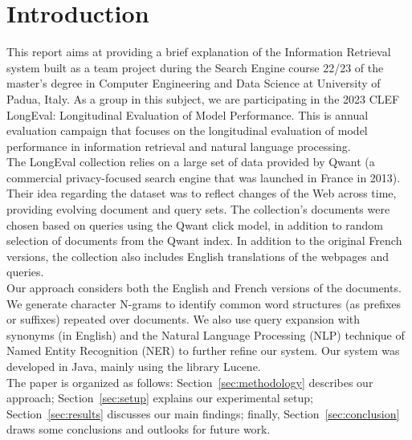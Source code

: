 \section{Introduction}\label{sec:introduction}
This report aims at providing a brief explanation of the Information Retrieval system built
as a team project during the Search Engine course 22/23 of the master’s degree in Computer
Engineering and Data Science at University of Padua, Italy.
As a group in this subject, we are participating in the 2023 CLEF LongEval: Longitudinal Evaluation of Model
Performance.
This is annual evaluation campaign that focuses on the longitudinal evaluation of model performance in information
retrieval and natural language processing.\\
The LongEval collection\cite{traindata} relies on a large set of data provided by Qwant (a commercial privacy-focused
search engine that was launched in France in 2013). %
Their idea regarding the dataset was to reflect changes of the Web across time, providing evolving document and query
sets.
The collection's documents were chosen based on queries using the Qwant click model, in addition to random selection of
documents from the Qwant index.
In addition to the original French versions, the collection also includes English translations of the webpages and
queries.\\
Our approach considers both the English and French versions of the documents.
We generate character N-grams to identify common word structures (as prefixes or suffixes) repeated over documents.
We also use query expansion with synonyms (in English) and the Natural Language Processing (NLP) technique of Named
Entity Recognition (NER) to further refine our system.
Our system was developed in Java, mainly using the library Lucene.\\
The paper is organized as follows: Section~\ref{sec:methodology} describes our approach;
Section~\ref{sec:setup} explains our experimental setup;
Section~\ref{sec:results} discusses our main findings; finally,
Section~\ref{sec:conclusion} draws some conclusions and outlooks for future work.